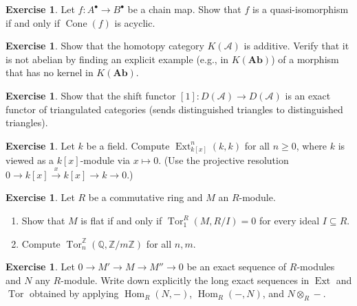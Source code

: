 \documentclass[a4paper,12pt]{book}
\DeclareMathOperator{\Hom}{Hom}
\newcommand{\Ab}{\mathbf{Ab}}
\theoremstyle{definition}
\newtheorem{exercise}[definition]{Exercise}
\theoremstyle{plain}
\theoremstyle{remark}
\begin{document}
\begin{exercise}\label{exo:acyclic-cone}
Let $f \colon A^\bullet \to B^\bullet$ be a chain map. Show that $f$ is a quasi-isomorphism
if and only if $\operatorname{Cone}(f)$ is acyclic.
\end{exercise}

\begin{exercise}\label{exo:homotopy-category-additive}
Show that the homotopy category $K(\mathcal{A})$ is additive. Verify that it is not
abelian by finding an explicit example (e.g., in $K(\Ab)$) of a morphism that has no
kernel in $K(\Ab)$.
\end{exercise}

\begin{exercise}\label{exo:shift-exact}
Show that the shift functor $[1] \colon D(\mathcal{A}) \to D(\mathcal{A})$ is an
exact functor of triangulated categories (sends distinguished triangles to
distinguished triangles).
\end{exercise}

\begin{exercise}\label{exo:ext-computation}
Let $k$ be a field. Compute $\operatorname{Ext}^n_{k[x]}(k, k)$ for all $n \geq 0$,
where $k$ is viewed as a $k[x]$-module via $x \mapsto 0$. (Use the projective resolution
$0 \to k[x] \xrightarrow{x} k[x] \to k \to 0$.)
\end{exercise}

\begin{exercise}\label{exo:tor-flat}
Let $R$ be a commutative ring and $M$ an $R$-module.
\begin{enumerate}
    \item Show that $M$ is flat if and only if $\operatorname{Tor}_1^R(M, R/I) = 0$ for
    every ideal $I \subseteq R$.
    \item Compute $\operatorname{Tor}_n^{\mathbb{Z}}(\mathbb{Q}, \mathbb{Z}/m\mathbb{Z})$
    for all $n, m$.
\end{enumerate}
\end{exercise}

\begin{exercise}\label{exo:derived-ses}
Let $0 \to M' \to M \to M'' \to 0$ be an exact sequence of $R$-modules and $N$ any
$R$-module. Write down explicitly the long exact sequences in $\operatorname{Ext}$ and
$\operatorname{Tor}$ obtained by applying $\Hom_R(N, -)$, $\Hom_R(-, N)$, and
$N \otimes_R -$.
\end{exercise}
\end{document}
